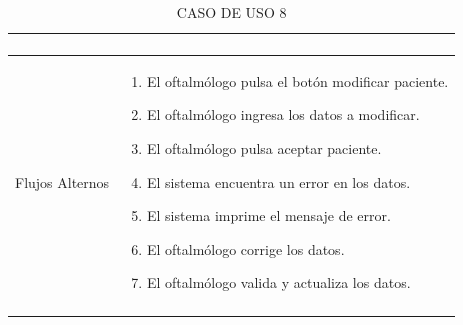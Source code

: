 \documentclass[10pt]{article}
\begin{document}
\begin{longtable}{|p{3.8cm}|p{10.8cm}|}
\begin{enumerate}
\end{enumerate}
    \\
\hline
Flujos Alternos &  \begin{enumerate}
    \item El oftalmólogo pulsa el botón modificar paciente.
    \item El oftalmólogo ingresa los datos a modificar.
    \item El oftalmólogo pulsa aceptar paciente.
    \item El sistema encuentra un error en los datos.
    \item El sistema imprime el mensaje de error.
    \item El oftalmólogo corrige los datos.
    \item El oftalmólogo valida y actualiza los datos.
\end{enumerate}
    \\
\hline
\caption{CASO DE USO 8}
\label{tabla1}
\end{longtable}


\newpage 
\end{document}
